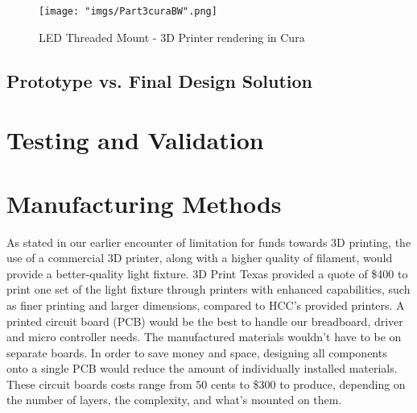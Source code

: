 \documentclass[12pt,a4paper]{report}
\begin{document}
\begin{figure}[H]
	\centering
	\texttt{[image: "imgs/Part3curaBW".png]}\par			\vspace{0.1cm}
	\caption{LED Threaded Mount - 3D Printer rendering in Cura}
\end{figure}

\subsection*{Prototype vs. Final Design Solution}

\section{Testing and Validation}

\section{Manufacturing Methods}
As stated in our earlier encounter of limitation for funds towards 3D printing, the use of a commercial 3D printer, along with a higher quality of filament, would provide a better-quality light fixture. 3D Print Texas provided a quote of \$400 to print one set of the light fixture through printers with enhanced capabilities, such as finer printing and larger dimensions, compared to HCC's provided printers.
A printed circuit board (PCB) would be the best to handle our breadboard, driver and micro controller needs. The manufactured materials wouldn't have to be on separate boards. In order to save money and space, designing all components onto a single PCB would reduce the amount of individually installed materials. These circuit boards costs range from 50 cents to \$300 to produce, depending on the number of layers, the complexity, and what's mounted on them.
\end{document}
